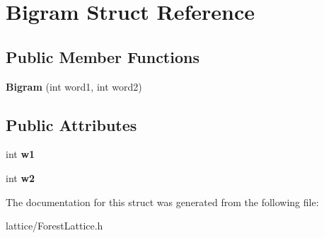 \hypertarget{struct_bigram}{
\section{Bigram Struct Reference}
\label{struct_bigram}
}
\subsection*{Public Member Functions}
\begin{DoxyCompactItemize}
\item 
\hypertarget{struct_bigram_a020c686282bd0fb8d36bb1599c6b1a14}{
{\bfseries Bigram} (int word1, int word2)}
\label{struct_bigram_a020c686282bd0fb8d36bb1599c6b1a14}

\end{DoxyCompactItemize}
\subsection*{Public Attributes}
\begin{DoxyCompactItemize}
\item 
\hypertarget{struct_bigram_a27e17775db4f1239992f52ca5946c42b}{
int {\bfseries w1}}
\label{struct_bigram_a27e17775db4f1239992f52ca5946c42b}

\item 
\hypertarget{struct_bigram_a0dfa6c244c9d3a4730c1338e94b1723b}{
int {\bfseries w2}}
\label{struct_bigram_a0dfa6c244c9d3a4730c1338e94b1723b}

\end{DoxyCompactItemize}


The documentation for this struct was generated from the following file:\begin{DoxyCompactItemize}
\item 
lattice/ForestLattice.h\end{DoxyCompactItemize}
